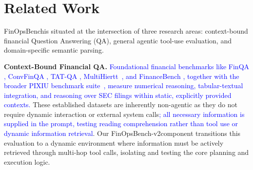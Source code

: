 \documentclass[11pt]{article}
\newcommand{\edit}[1]{\textcolor{blue}{#1}}
\newcommand{\editN}[1]{\textcolor{editgreen}{#1}}
\newcommand{\datasetname}{FinOpsBench}\xspace
\newcommand{\groundedfinqa}{FinOpsBench-v2}\xspace
\begin{document}

\section{Related Work}

\datasetname is situated at the intersection of three research areas: context-bound financial Question Answering (QA), general
agentic tool-use evaluation, and domain-specific semantic parsing.

\noindent \textbf{Context-Bound Financial QA.}
\edit{Foundational financial benchmarks like FinQA \citep{chen2021finqa}, ConvFinQA \citep{chen2022convfinqa}, TAT-QA \citep{zhu-etal-2021-tat}, \editN{MultiHiertt~\citep{zhao2022multihiertt}}, and FinanceBench \citep{islam2023financebench}\editN{, together with the broader PIXIU benchmark suite~\citep{xie2023pixiu},} measure numerical reasoning, tabular-textual integration, and reasoning over SEC filings within static, explicitly provided contexts.} These established datasets are inherently
non-agentic as they do not require dynamic interaction or external system calls\edit{; all necessary information is supplied in the prompt, testing reading comprehension rather than tool use or dynamic information retrieval}. Our \groundedfinqa component transitions this
evaluation to a dynamic environment where information must be actively retrieved through multi-hop tool calls, isolating and
testing the core planning and execution logic.
\end{document}
